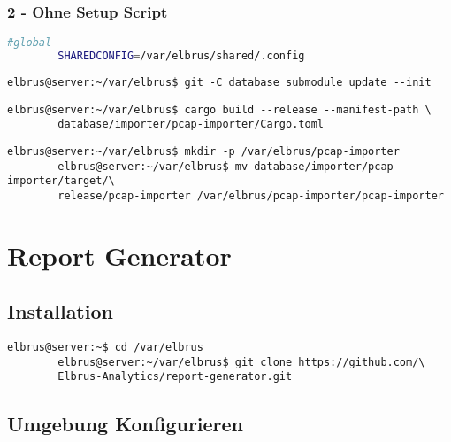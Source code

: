 \documentclass{article}
\begin{document}
	\newpage
	\subsubsection{2 - Ohne Setup Script}	
	\lstset{style=files}
	\begin{lstlisting}[caption={Anhand von '.env.example' eigene '.env' Datei anlegen.}, language=bash]
		#global
		SHAREDCONFIG=/var/elbrus/shared/.config
	\end{lstlisting}

	\lstset{style=commands}
	\begin{lstlisting}[caption={Updaten der git Submodule.}]
		elbrus@server:~/var/elbrus$ git -C database submodule update --init
	\end{lstlisting}

	\begin{lstlisting}[caption={Kompilieren des 'pcap-importers'.}]
		elbrus@server:~/var/elbrus$ cargo build --release --manifest-path \
		database/importer/pcap-importer/Cargo.toml
	\end{lstlisting}

	\begin{lstlisting}[caption={Kopieren des 'pcap-importers' in ein eigenes Verzeichniss.}]
		elbrus@server:~/var/elbrus$ mkdir -p /var/elbrus/pcap-importer
		elbrus@server:~/var/elbrus$ mv database/importer/pcap-importer/target/\
		release/pcap-importer /var/elbrus/pcap-importer/pcap-importer
	\end{lstlisting}
	\newpage
	
	\section{Report Generator}
	\lstset{style=commands}
	\subsection{Installation}
	\begin{lstlisting}[caption={Clonen der Software von GitHub.}]
		elbrus@server:~$ cd /var/elbrus
		elbrus@server:~/var/elbrus$ git clone https://github.com/\
		Elbrus-Analytics/report-generator.git
	\end{lstlisting}

	\subsection[file config]{Umgebung Konfigurieren}
	
\end{document}
